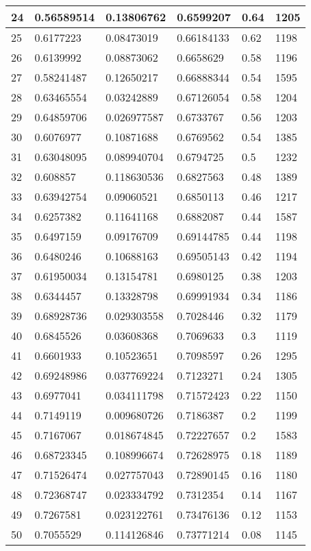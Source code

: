 \begin{longtable}{|l|l|l|l|l|l|}
24 & 0.56589514 & 0.13806762 & 0.6599207 & 0.64 & 1205 \\ \hline 
25 & 0.6177223 & 0.08473019 & 0.66184133 & 0.62 & 1198 \\ \hline 
26 & 0.6139992 & 0.08873062 & 0.6658629 & 0.58 & 1196 \\ \hline 
27 & 0.58241487 & 0.12650217 & 0.66888344 & 0.54 & 1595 \\ \hline 
28 & 0.63465554 & 0.03242889 & 0.67126054 & 0.58 & 1204 \\ \hline 
29 & 0.64859706 & 0.026977587 & 0.6733767 & 0.56 & 1203 \\ \hline 
30 & 0.6076977 & 0.10871688 & 0.6769562 & 0.54 & 1385 \\ \hline 
31 & 0.63048095 & 0.089940704 & 0.6794725 & 0.5 & 1232 \\ \hline 
32 & 0.608857 & 0.118630536 & 0.6827563 & 0.48 & 1389 \\ \hline 
33 & 0.63942754 & 0.09060521 & 0.6850113 & 0.46 & 1217 \\ \hline 
34 & 0.6257382 & 0.11641168 & 0.6882087 & 0.44 & 1587 \\ \hline 
35 & 0.6497159 & 0.09176709 & 0.69144785 & 0.44 & 1198 \\ \hline 
36 & 0.6480246 & 0.10688163 & 0.69505143 & 0.42 & 1194 \\ \hline 
37 & 0.61950034 & 0.13154781 & 0.6980125 & 0.38 & 1203 \\ \hline 
38 & 0.6344457 & 0.13328798 & 0.69991934 & 0.34 & 1186 \\ \hline 
39 & 0.68928736 & 0.029303558 & 0.7028446 & 0.32 & 1179 \\ \hline 
40 & 0.6845526 & 0.03608368 & 0.7069633 & 0.3 & 1119 \\ \hline 
41 & 0.6601933 & 0.10523651 & 0.7098597 & 0.26 & 1295 \\ \hline 
42 & 0.69248986 & 0.037769224 & 0.7123271 & 0.24 & 1305 \\ \hline 
43 & 0.6977041 & 0.034111798 & 0.71572423 & 0.22 & 1150 \\ \hline 
44 & 0.7149119 & 0.009680726 & 0.7186387 & 0.2 & 1199 \\ \hline 
45 & 0.7167067 & 0.018674845 & 0.72227657 & 0.2 & 1583 \\ \hline 
46 & 0.68723345 & 0.108996674 & 0.72628975 & 0.18 & 1189 \\ \hline 
47 & 0.71526474 & 0.027757043 & 0.72890145 & 0.16 & 1180 \\ \hline 
48 & 0.72368747 & 0.023334792 & 0.7312354 & 0.14 & 1167 \\ \hline 
49 & 0.7267581 & 0.023122761 & 0.73476136 & 0.12 & 1153 \\ \hline 
50 & 0.7055529 & 0.114126846 & 0.73771214 & 0.08 & 1145 \\ \hline 
\end{longtable}